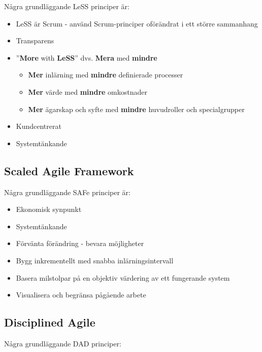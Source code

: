 		
	
		Några grundläggande LeSS principer är: \cite{less_principles}
		
		\begin{itemize}
			\setlength{\itemsep}{1pt}
			\item LeSS är Scrum - använd Scrum-principer oförändrat i ett större sammanhang			
			\item Transparens
			\item ''\textbf{More} with \textbf{LeSS}'' dvs. \textbf{Mera} med \textbf{mindre}
				\begin{itemize}
					\item \textbf{Mer} inlärning med \textbf{mindre} definierade processer
					\item \textbf{Mer} värde med \textbf{mindre} omkostnader
					\item \textbf{Mer} ägarskap och syfte med \textbf{mindre} huvudroller och specialgrupper
				\end{itemize}
			\item Kundcentrerat
			\item Systemtänkande
		\end{itemize}
		
	\subsection{Scaled Agile Framework}
	
		
		Några grundläggande SAFe principer är: \cite{safe_principles}
		\begin{itemize}
			\item Ekonomisk synpunkt
			\item Systemtänkande
			\item Förvänta förändring - bevara möjligheter
			\item Bygg inkrementellt med snabba inlärningsintervall
			\item Basera milstolpar på en objektiv värdering av ett fungerande system
			\item Visualisera och begränsa pågående arbete
		\end{itemize}
		
	
	\subsection{Disciplined Agile}
	
		Några grundläggande DAD principer: \cite{dad_principles}
		
	\newpage

